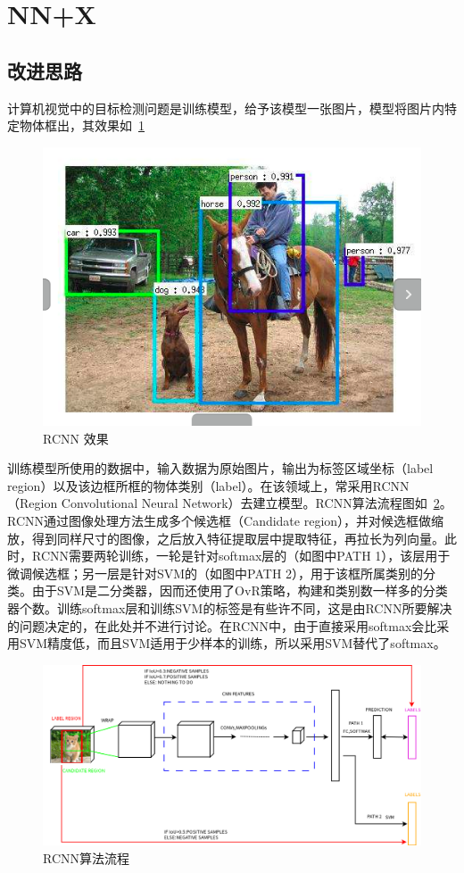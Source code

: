 \section{NN+X}
\subsection{改进思路}
计算机视觉中的目标检测问题是训练模型，给予该模型一张图片，模型将图片内特定物体框出，其效果如~\ref{fig:rcnn1}
\begin{figure}[htb]
\centering
\includegraphics[scale=0.4]{../figures/rcnn1.png} 
\caption{RCNN 效果}
\label{fig:rcnn1}
\end{figure}
训练模型所使用的数据中，输入数据为原始图片，输出为标签区域坐标（label region）以及该边框所框的物体类别（label）。在该领域上，常采用RCNN（Region Convolutional Neural Network）去建立模型。RCNN算法流程图如~\ref{fig:rcnn2}。RCNN通过图像处理方法生成多个候选框（Candidate region），并对候选框做缩放，得到同样尺寸的图像，之后放入特征提取层中提取特征，再拉长为列向量。此时，RCNN需要两轮训练，一轮是针对softmax层的（如图中PATH 1），该层用于微调候选框；另一层是针对SVM的（如图中PATH 2），用于该框所属类别的分类。由于SVM是二分类器，因而还使用了OvR策略，构建和类别数一样多的分类器个数。训练softmax层和训练SVM的标签是有些许不同，这是由RCNN所要解决的问题决定的，在此处并不进行讨论。在RCNN中，由于直接采用softmax会比采用SVM精度低，而且SVM适用于少样本的训练，所以采用SVM替代了softmax。
\begin{figure}[htb]
\centering
\includegraphics[scale=0.4]{../figures/rcnn_2.png} 
\caption{RCNN算法流程}
\label{fig:rcnn2}
\end{figure}


